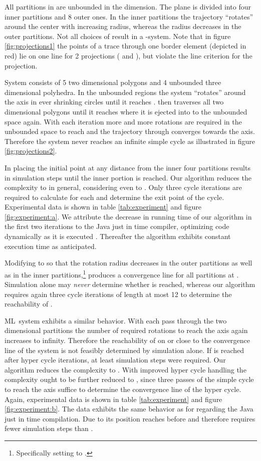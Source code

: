 \documentclass[copyright,creativecommons]{packages/eptcs}
\newcommand{\ml}{\mbox{ML}}
\begin{document}
All partitions in  are unbounded in the  dimension. The  plane is divided into four inner partitions and 8 outer ones. In the inner partitions the trajectory \enquote{rotates} around the center with increasing radius, whereas the radius decreases in the outer partitions. 
Not all choices of  result in a -system. Note that in figure \ref{fig:projections1} the points of a trace through one border element (depicted in red) lie on one line for 2 projections ( and ), but violate the line criterion for the  projection.



System  consists of 5 two dimensional polygons and 4 unbounded three dimensional polyhedra. In the unbounded regions the system \enquote{rotates} around the  axis in ever shrinking circles until it reaches .  then traverses all two dimensional polygons until it reaches  where it is ejected into to the unbounded space again. With each iteration more and more rotations are required in the unbounded space to reach  and the trajectory through  converges towards the  axis. Therefore the system never reaches an infinite simple cycle as illustrated in figure \ref{fig:projections2}.

In  placing the initial point  at any distance  from the inner four partitions results in  simulation steps until the inner portion is reached. Our algorithm reduces the complexity to  in general, considering  even to . Only three cycle iterations are required to calculate  for each  and determine the exit point of the cycle. Experimental data is shown in table \ref{tab:experiment} and figure \ref{fig:experiment:a}. We attribute the decrease in running time of our algorithm in the first two iterations to the Java just in time compiler, optimizing code dynamically as it is executed \cite{CetAl97}. Thereafter the algorithm exhibits constant execution time as anticipated.

Modifying  to  so that the rotation radius decreases in the outer partitions as well as in the inner partitions,\footnote{Specifically setting  to .} produces a convergence line for all partitions at . Simulation alone may \emph{never} determine whether  is reached, whereas our algorithm requires again three cycle iterations of length at most 12 to determine the reachability of .

\ml~system  exhibits a similar behavior. With each pass through the two dimensional partitions the number of required rotations to reach the  axis again increases to infinity. Therefore the reachability of  on or close to the convergence line of the system is not feasibly determined by simulation alone. If  is reached after  hyper cycle iterations, at least  simulation steps were required. Our algorithm reduces the complexity to . With improved hyper cycle handling the complexity ought to be further reduced to , since three passes of the simple cycle to reach the  axis suffice to determine the convergence line of the hyper cycle. Again, experimental data is shown in table \ref{tab:experiment} and figure \ref{fig:experiment:b}. The data exhibits the same behavior as for  regarding the Java just in time compilation. Due to its position  reaches  before  and therefore requires fewer simulation steps than .
\end{document}
